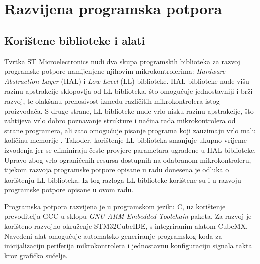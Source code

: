 \chapter{Razvijena programska potpora}
    \section{Korištene biblioteke i alati}
        Tvrtka ST Microelectronics nudi dva skupa programskih biblioteka za razvoj programske potpore namijenjene njihovim mikrokontrolerima: \textit{Hardware Abstraction Layer} (HAL) i \textit{Low Level} (LL) biblioteke. HAL biblioteke nude višu razinu apstrakcije sklopovlja od LL biblioteka, što omogućuje jednostavniji i brži razvoj, te olakšanu prenosivost između različitih mikrokontrolera istog proizvođača. S druge strane, LL biblioteke nude vrlo nisku razinu apstrakcije, što zahtijeva vrlo dobro poznavanje strukture i načina rada mikrokontrolera od strane programera, ali zato omogućuje pisanje programa koji zauzimaju vrlo malu količinu memorije \cite{stm_hal_ll}. Također, korištenje LL biblioteka smanjuje ukupno vrijeme izvođenja jer se eliminiraju česte provjere parametara ugrađene u HAL biblioteke. Upravo zbog vrlo ograničenih resursa dostupnih na odabranom mikrokontroleru, tijekom razvoja programske potpore opisane u radu \cite{diplomski_goran_petrak} donesena je odluka o korištenju LL biblioteka. Iz tog razloga LL biblioteke korištene su i u razvoju programske potpore opisane u ovom radu.

        Programska potpora razvijena je u programskom jeziku C, uz korištenje prevoditelja GCC u sklopu \textit{GNU ARM Embedded Toolchain} paketa. Za razvoj je korišteno razvojno okruženje STM32CubeIDE, s integriranim alatom CubeMX. Navedeni alat omogućuje automatsko generiranje programskog koda za inicijalizaciju periferija mikrokontrolera i jednostavnu konfiguraciju signala takta kroz grafičko sučelje.